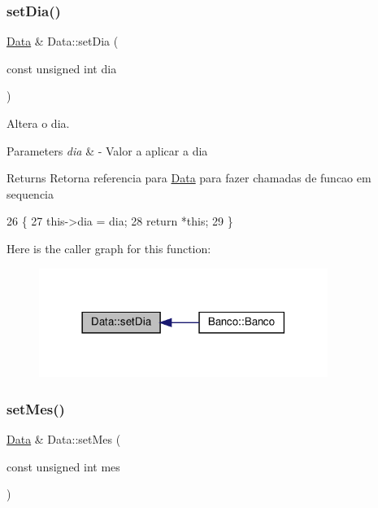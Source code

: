 \subsubsection{\texorpdfstring{set\+Dia()}{setDia()}}
{\footnotesize\ttfamily \hyperlink{classData}{Data} \& Data\+::set\+Dia (\begin{DoxyParamCaption}\item[{const unsigned int}]{dia }\end{DoxyParamCaption})}



Altera o dia. 


\begin{DoxyParams}{Parameters}
{\em dia} & -\/ Valor a aplicar a dia \\
\hline
\end{DoxyParams}
\begin{DoxyReturn}{Returns}
Retorna referencia para \hyperlink{classData}{Data} para fazer chamadas de funcao em sequencia 
\end{DoxyReturn}

\begin{DoxyCode}
26                                           \{
27     this->dia = dia;
28     \textcolor{keywordflow}{return} *\textcolor{keyword}{this};
29 \}
\end{DoxyCode}
Here is the caller graph for this function\+:
\nopagebreak
\begin{figure}[H]
\begin{center}
\leavevmode
\includegraphics[width=266pt]{classData_a3e2c5356bc8d548b75c7d085f7a7c4ee_icgraph}
\end{center}
\end{figure}
\mbox{\label{classData_ab15051ae481d89d057b22abc8152584c}} 
\subsubsection{\texorpdfstring{set\+Mes()}{setMes()}}
{\footnotesize\ttfamily \hyperlink{classData}{Data} \& Data\+::set\+Mes (\begin{DoxyParamCaption}\item[{const unsigned int}]{mes }\end{DoxyParamCaption})}



